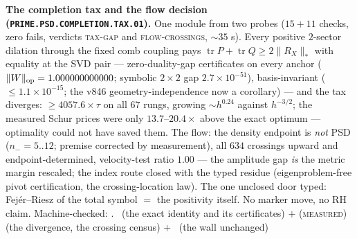 \par\smallskip\noindent\textbf{The completion tax and the flow
decision (\texttt{PRIME.PSD.COMPLETION.TAX.01}).}
One module from two probes ($15 + 11$ checks, zero fails,
verdicts \textsc{tax-gap} and \textsc{flow-crossings},
${\sim}35$ s).  Every positive $2$-sector dilation through the
fixed comb coupling pays $\operatorname{tr}P + \operatorname{tr}Q
\ge 2\lVert R_X\rVert_{*}$ with equality at the SVD pair ---
zero-duality-gap certificates on every anchor ($\lVert
W\rVert_{\rm op} = 1.000000000000$; symbolic $2\times2$ gap
$2.7\times10^{-51}$), basis-invariant ($\le 1.1\times10^{-15}$;
the v846 geometry-independence now a corollary) --- and the tax
diverges: $\ge 4057.6\times\tau$ on all $67$ rungs, growing
$\sim h^{0.24}$ against $h^{-3/2}$; the measured Schur prices
were only $13.7$--$20.4\times$ above the exact optimum ---
optimality could not have saved them.  The flow: the density
endpoint is \emph{not} PSD ($n_- = 5..12$; premise corrected by
measurement), all $634$ crossings upward and endpoint-determined,
velocity-test ratio $1.00$ --- the amplitude gap \emph{is} the
metric margin rescaled; the index route closed with the typed
residue (eigenproblem-free pivot certification, the
crossing-location law).  The one unclosed door typed:
Fej\'er--Riesz of the total symbol $=$ the positivity itself.
No marker move, no RH claim.
Machine-checked: .
\mE\ (the exact identity and its certificates) $+$
(\textsc{measured}) (the divergence, the crossing census) $+$
\mO\ (the wall unchanged)
\par\smallskip


